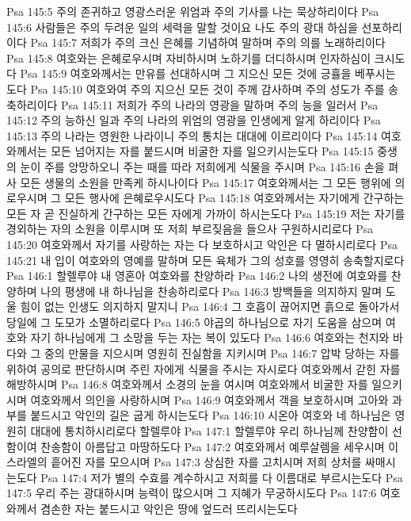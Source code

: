 Psa 145:5  주의 존귀하고 영광스러운 위엄과 주의 기사를 나는 묵상하리이다
Psa 145:6  사람들은 주의 두려운 일의 세력을 말할 것이요 나도 주의 광대 하심을 선포하리이다
Psa 145:7  저희가 주의 크신 은혜를 기념하여 말하며 주의 의를 노래하리이다
Psa 145:8  여호와는 은혜로우시며 자비하시며 노하기를 더디하시며 인자하심이 크시도다
Psa 145:9  여호와께서는 만유를 선대하시며 그 지으신 모든 것에 긍휼을 베푸시는도다
Psa 145:10  여호와여 주의 지으신 모든 것이 주께 감사하며 주의 성도가 주를 송축하리이다
Psa 145:11  저희가 주의 나라의 영광을 말하며 주의 능을 일러서
Psa 145:12  주의 능하신 일과 주의 나라의 위엄의 영광을 인생에게 알게 하리이다
Psa 145:13  주의 나라는 영원한 나라이니 주의 통치는 대대에 이르리이다
Psa 145:14  여호와께서는 모든 넘어지는 자를 붙드시며 비굴한 자를 일으키시는도다
Psa 145:15  중생의 눈이 주를 앙망하오니 주는 때를 따라 저희에게 식물을 주시며
Psa 145:16  손을 펴사 모든 생물의 소원을 만족케 하시나이다
Psa 145:17  여호와께서는 그 모든 행위에 의로우시며 그 모든 행사에 은혜로우시도다
Psa 145:18  여호와께서는 자기에게 간구하는 모든 자 곧 진실하게 간구하는 모든 자에게 가까이 하시는도다
Psa 145:19  저는 자기를 경외하는 자의 소원을 이루시며 또 저희 부르짖음을 들으사 구원하시리로다
Psa 145:20  여호와께서 자기를 사랑하는 자는 다 보호하시고 악인은 다 멸하시리로다
Psa 145:21  내 입이 여호와의 영예를 말하며 모든 육체가 그의 성호를 영영히 송축할지로다
Psa 146:1  할렐루야 내 영혼아 여호와를 찬양하라
Psa 146:2  나의 생전에 여호와를 찬양하며 나의 평생에 내 하나님을 찬송하리로다
Psa 146:3  방백들을 의지하지 말며 도울 힘이 없는 인생도 의지하지 말지니
Psa 146:4  그 호흡이 끊어지면 흙으로 돌아가서 당일에 그 도모가 소멸하리로다
Psa 146:5  야곱의 하나님으로 자기 도움을 삼으며 여호와 자기 하나님에게 그 소망을 두는 자는 복이 있도다
Psa 146:6  여호와는 천지와 바다와 그 중의 만물을 지으시며 영원히 진실함을 지키시며
Psa 146:7  압박 당하는 자를 위하여 공의로 판단하시며 주린 자에게 식물을 주시는 자시로다 여호와께서 갇힌 자를 해방하시며
Psa 146:8  여호와께서 소경의 눈을 여시며 여호와께서 비굴한 자를 일으키시며 여호와께서 의인을 사랑하시며
Psa 146:9  여호와께서 객을 보호하시며 고아와 과부를 붙드시고 악인의 길은 굽게 하시는도다
Psa 146:10  시온아 여호와 네 하나님은 영원히 대대에 통치하시리로다 할렐루야
Psa 147:1  할렐루야 우리 하나님께 찬양함이 선함이여 찬송함이 아름답고 마땅하도다
Psa 147:2  여호와께서 예루살렘을 세우시며 이스라엘의 흩어진 자를 모으시며
Psa 147:3  상심한 자를 고치시며 저희 상처를 싸매시는도다
Psa 147:4  저가 별의 수효를 계수하시고 저희를 다 이름대로 부르시는도다
Psa 147:5  우리 주는 광대하시며 능력이 많으시며 그 지혜가 무궁하시도다
Psa 147:6  여호와께서 겸손한 자는 붙드시고 악인은 땅에 엎드러 뜨리시는도다

